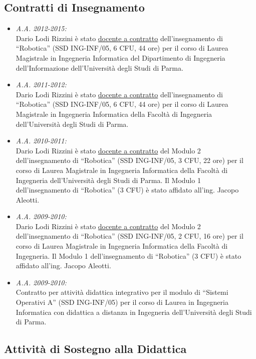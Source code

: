 \documentclass[11pt]{article}
\newcommand{\ITEMDATE}[1]{\item \textit{#1:}\\}
\begin{document}
\subsection*{Contratti di Insegnamento}

\begin{itemize}
\ITEMDATE{A.A. 2012-2015}
Dario Lodi Rizzini \`e stato \underline{docente a contratto} dell'insegnamento di ``Robotica'' (SSD ING-INF/05, 6 CFU, 44 ore)
per il corso di Laurea Magistrale in Ingegneria Informatica del Dipartimento di Ingegneria dell'Informazione 
dell'Universit\`a degli Studi di Parma.

\ITEMDATE{A.A. 2011-2012}
Dario Lodi Rizzini \`e stato \underline{docente a contratto} dell'insegnamento di ``Robotica'' (SSD ING-INF/05, 6 CFU, 44 ore)
per il corso di Laurea Magistrale in Ingegneria Informatica della Facolt\`a di Ingegneria 
dell'Universit\`a degli Studi di Parma.

\ITEMDATE{A.A. 2010-2011}
Dario Lodi Rizzini \`e stato \underline{docente a contratto} del Modulo 2 dell'insegnamento di ``Robotica'' 
(SSD ING-INF/05, 3 CFU, 22 ore) per il corso di Laurea Magistrale in Ingegneria Informatica 
della Facolt\`a di Ingegneria dell'Universit\`a degli Studi di Parma.
Il Modulo 1 dell'insegnamento di ``Robotica'' (3 CFU) \`e stato affidato all'ing. Jacopo Aleotti.

\ITEMDATE{A.A. 2009-2010}
Dario Lodi Rizzini \`e stato \underline{docente a contratto} del Modulo 2 dell'insegnamento di ``Robotica'' 
(SSD ING-INF/05, 2 CFU, 16 ore) per il corso di Laurea Magistrale in Ingegneria Informatica della Facolt\`a di Ingegneria.
Il Modulo 1 dell'insegnamento di ``Robotica''  (3 CFU) \`e stato affidato all'ing. Jacopo Aleotti.

\ITEMDATE{A.A. 2009-2010}
Contratto per attivit\`a didattica integrativo per il modulo di
``Sistemi Operativi A'' (SSD ING-INF/05) per il corso di Laurea in Ingegneria Informatica con didattica a 
distanza in Ingegneria dell'Universit\`a degli Studi di Parma.
\end{itemize}

\subsection*{Attivit\`a di Sostegno alla Didattica}
\end{document}
